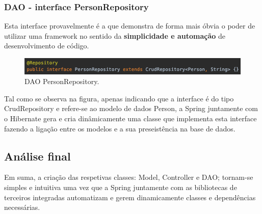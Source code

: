 \subsubsection{DAO - interface PersonRepository}

\hspace{5mm} Esta interface provavelmente é a que demonstra de forma mais óbvia o poder de utilizar uma framework no sentido da \textbf{simplicidade e automação} de desenvolvimento de código.

\begin{figure}[H]
    \centering
    \includegraphics[scale=0.5]{images/PersonRepository.png}
    \caption{DAO PersonRepository.}
    \label{fig:grails}
\end{figure}

\hspace{5mm} Tal como se observa na figura, apenas indicando que a interface é do tipo CrudRepository e refere-se ao modelo de dados Person, a Spring juntamente com o Hibernate gera e cria dinâmicamente uma classe que implementa esta interface fazendo a ligação entre os modelos e a sua preseistência na base de dados.

\subsection{Análise final}

\hspace{5mm} Em suma, a criação das respetivas classes: Model, Controller e DAO; tornam-se simples e intuitiva uma vez que a Spring juntamente com as bibliotecas de terceiros integradas automatizam e gerem dinamicamente classes e dependências necessárias. 